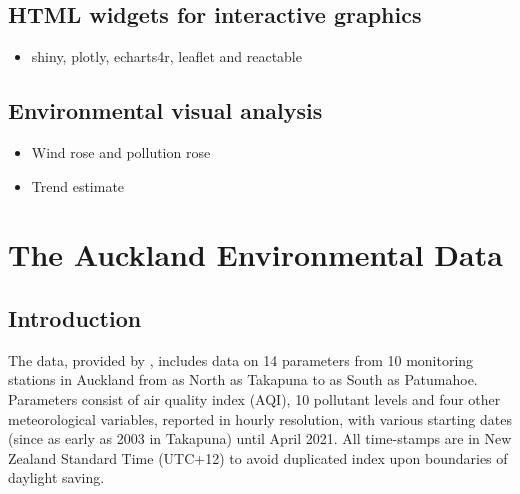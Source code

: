 \documentclass{aucklandthesis}
\begin{document}
\hypertarget{html-widgets-for-interactive-graphics}{%
\section{HTML widgets for interactive graphics}\label{html-widgets-for-interactive-graphics}}

\begin{itemize}
\tightlist
\item
  shiny, plotly, echarts4r, leaflet and reactable
\end{itemize}

\hypertarget{environmental-visual-analysis}{%
\section{Environmental visual analysis}\label{environmental-visual-analysis}}

\begin{itemize}
\tightlist
\item
  Wind rose and pollution rose
\item
  Trend estimate
\end{itemize}

\hypertarget{ch:data}{%
\chapter{The Auckland Environmental Data}\label{ch:data}}

\hypertarget{sec:intro}{%
\section{Introduction}\label{sec:intro}}

The data, provided by \textcite{aklenvdata}, includes data on 14 parameters from 10 monitoring stations in Auckland from as North as Takapuna to as South as Patumahoe. Parameters consist of air quality index (AQI), 10 pollutant levels and four other meteorological variables, reported in hourly resolution, with various starting dates (since as early as 2003 in Takapuna) until April 2021. All time-stamps are in New Zealand Standard Time (UTC+12) to avoid duplicated index upon boundaries of daylight saving.
\end{document}
